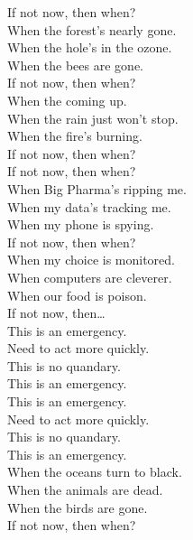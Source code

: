 
\label{album:lw}





If not now, then when? \\

When the forest's nearly gone. \\
When the hole's in the ozone. \\
When the bees are gone. \\
If not now, then when? \\

When the  coming up. \\
When the rain just won't stop. \\
When the fire's burning. \\
If not now, then when? \\

If not now, then when? \\
When Big Pharma's ripping me. \\
When my data's tracking me. \\
When my phone is spying. \\
If not now, then when? \\

When my choice is monitored. \\
When computers are cleverer. \\
When our food is poison. \\
If not now, then… \\

This is an emergency. \\
Need to act more quickly. \\
This is no quandary. \\
This is an emergency. \\

This is an emergency. \\
Need to act more quickly. \\
This is no quandary. \\
This is an emergency. \\

When the oceans turn to black. \\
When the animals are dead. \\
When the birds are gone. \\
If not now, then when? \\

